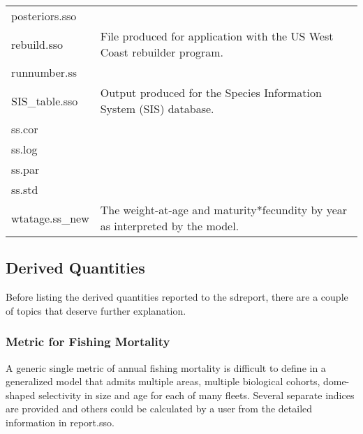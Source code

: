 \begin{center}
\begin{longtable}{p{5cm} p{11cm}}
		posteriors.sso & \\
		rebuild.sso & File produced for application with the US West Coast rebuilder program.\\
		runnumber.ss & \\
		SIS\_table.sso & Output produced for the Species Information System (SIS) database.\\
		ss.cor & \\
		ss.log & \\
		ss.par & \\
		ss.std & \\
		wtatage.ss\_new & The weight-at-age and maturity*fecundity by year as interpreted by the model.\\
		\hline
	\end{longtable}
\end{center}

\subsection{Derived Quantities}
Before listing the derived quantities reported to the sdreport, there are a couple of topics that deserve further explanation.

\subsubsection{Metric for Fishing Mortality}
A generic single metric of annual fishing mortality is difficult to define in a generalized model that admits multiple areas, multiple biological cohorts, dome-shaped selectivity in size and age for each of many fleets.  Several separate indices are provided and others could be calculated by a user from the detailed information in report.sso.

